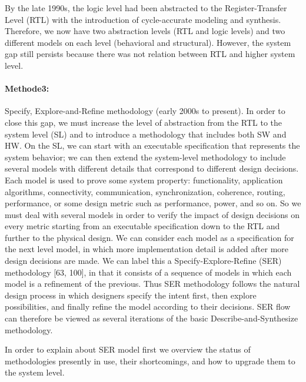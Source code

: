 By the late 1990s, the logic level had been abstracted to the Register-Transfer Level (RTL) with the introduction of cycle-accurate modeling and synthesis.
Therefore, we now have two abstraction levels (RTL and logic levels) and two different models on each level (behavioral and structural).
However, the system gap still persists because there was not relation between RTL and higher system level.


\paragraph{Methode3:}
Specify, Explore-and-Refine methodology (early 2000s to present).
In order to close this gap, we must increase the level of abstraction from the RTL to the system level (SL) and to introduce a methodology that includes both SW and HW.
On the SL, we can start with an executable specification that represents the system behavior; we can then extend the system-level methodology to include several models with different details
that correspond to different design decisions. Each model is used to prove some system property: functionality, application algorithms, connectivity, communication, synchronization, coherence, routing, performance, or some design metric such as performance, power, and so on.
So we must deal with several models in order to verify the impact of design decisions on every metric starting from an executable specification down to the RTL and further to the physical design.
We can consider each model as a specification for the next level model, in which more implementation detail is added after more design decisions are made.
We can label this a Specify-Explore-Refine (SER) methodology [63, 100], in that it consists of a sequence of models in which each model is a refinement of the previous.
Thus SER methodology follows the natural design process in which designers specify the intent first, then explore possibilities, and finally refine the model according to their decisions.
SER flow can therefore be viewed as several iterations of the basic Describe-and-Synthesize methodology.

In order to explain about SER model first we overview the status of methodologies presently in use, their shortcomings, and how to upgrade them to the system level.

